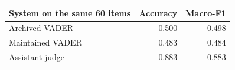 \begin{tabular}{lrr}
\toprule
System on the same 60 items & Accuracy & Macro-F1\\
\midrule
Archived VADER & 0.500 & 0.498 \\
Maintained VADER & 0.483 & 0.484 \\
Assistant judge & 0.883 & 0.883 \\
\bottomrule
\end{tabular}
